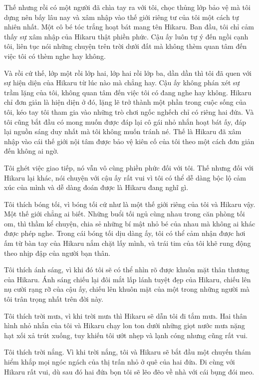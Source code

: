 {Thế nhưng rồi có một người đã chìa tay ra với tôi, chọc thủng lớp bảo vệ
mà tôi dựng nên bấy lâu nay và xâm nhập vào thế giới riêng tư của tôi
một cách tự nhiên nhất. Một cô bé tóc trắng hoạt bát mang tên Hikaru.
Ban đầu, tôi chỉ cảm thấy sự xâm nhập của Hikaru thật phiền phức. Cậu ấy
luôn tự ý đến ngồi cạnh tôi, liên tục nói những chuyện trên trời dưới
đất mà không thèm quan tâm đến việc tôi có thèm nghe hay không.

Và rồi cứ thế, lớp một rồi lớp hai, lớp hai rồi lớp ba, dần dần thì tôi
đã quen với sự hiện diện của Hikaru từ lúc nào mà chẳng hay. Cậu ấy
không phán xét sự trầm lặng của tôi, không quan tâm đến việc tôi có đang
nghe hay không. Hikaru chỉ đơn giản là hiện diện ở đó, lặng lẽ trở thành
một phần trong cuộc sống của tôi, kéo tay tôi tham gia vào những trò
chơi ngốc nghếch chỉ có riêng hai đứa. Và tôi cũng bắt đầu có mong muốn
được đáp lại cô gái nhỏ nhắn hoạt bát ấy, đáp lại nguồn sáng duy nhất mà
tôi không muốn tránh né. Thế là Hikaru đã xâm nhập vào cái thế giới nội
tâm được bảo vệ kiên cố của tôi theo một cách đơn giản đến không ai ngờ.

Tôi ghét việc giao tiếp, nó vẫn vô cùng phiền phức đối với tôi. Thế
nhưng đối với Hikaru lại khác, nói chuyện với cậu ấy rất vui vì tôi có
thể dễ dàng bộc lộ cảm xúc của mình và dễ dàng đoán được là Hikaru đang
nghĩ gì.

Tôi thích bóng tối, vì bóng tối cứ như là một thế giới riêng của tôi và
Hikaru vậy. Một thế giới chẳng ai biết. Những buổi tối ngủ cùng nhau
trong căn phòng tối om, thì thầm kể chuyện, chia sẻ những bí mật nhỏ bé
của nhau mà không ai khác được phép nghe. Trong cái bóng tối dịu dàng
ấy, tôi có thể cảm nhận được hơi ấm từ bàn tay của Hikaru nắm chặt lấy
mình, và trái tim của tôi khẽ rung động theo nhịp đập của người bạn
thân.

Tôi thích ánh sáng, vì khi đó tôi sẽ có thể nhìn rõ được khuôn mặt thân
thương của Hikaru. Ánh sáng chiếu lại đôi mắt lấp lánh tuyệt đẹp của
Hikaru, chiếu lên nụ cười rạng rỡ của cậu ấy, chiếu lên khuôn mặt của
một trong những người mà tôi trân trọng nhất trên đời này.

Tôi thích trời mưa, vì khi trời mưa thì Hikaru sẽ dẫn tôi đi tắm mưa.
Hai thân hình nhỏ nhắn của tôi và Hikaru chạy lon ton dưới những giọt
nước mưa nặng hạt xối xả trút xuống, tuy khiến tôi ướt nhẹp và lạnh cóng
nhưng cũng rất vui.

Tôi thích trời nắng. Vì khi trời nắng, tôi và Hikaru sẽ bắt đầu một
chuyến thám hiểm khắp mọi ngóc ngách của thị trấn nhỏ ở quê của hai đứa.
Đi cùng với Hikaru rất vui, dù sau đó hai đứa bọn tôi sẽ lẽo đẽo về nhà
với cái bụng đói meo.

}
